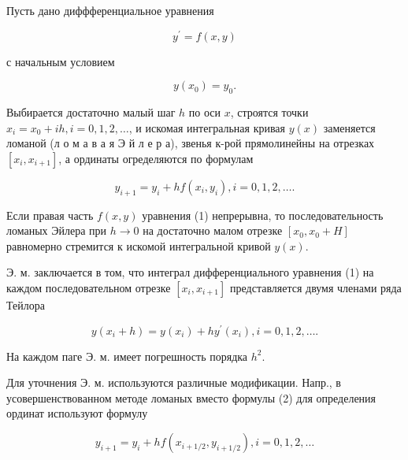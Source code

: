 \documentclass[10pt]{article}
\begin{document}
Пусть дано диффференциальное уравнения



\[

y^{\prime}=f(x, y)

\]



с начальным условием



\[

y\left(x_{0}\right)=y_{0} .

\]



Выбирается достаточно малый шаг $h$ по оси $x$, строятся точки $x_{i}=x_{0}+i h, i=0,1,2, \ldots$, и искомая интегральная кривая $y(x)$ заменяется ломаной (л о м а в а я Э й л е р а), звенья к-рой прямолинейны на отрезках $\left[x_{i}, x_{i+1}\right]$, а ординаты огределяются по формулам



\[

y_{i+1}=y_{i}+h f\left(x_{i}, y_{i}\right), i=0,1,2, \ldots .

\]



Если правая часть $f(x, y)$ уравнения (1) непрерывна, то последовательность ломаных Эйлера при $h \rightarrow 0$ на достаточно малом отрезке $\left[x_{0}, x_{0}+H\right]$ равномерно стремится к искомой интегральной кривой $y(x)$.



Э. м. заключается в том, что интеграл дифференциального уравнения (1) на каждом последовательном отрезке $\left[x_{i}, x_{i+1}\right]$ представляется двумя членами ряда Тейлора



\[

y\left(x_{i}+h\right)=y\left(x_{i}\right)+h y^{\prime}\left(x_{i}\right), i=0,1,2, \ldots .

\]



На каждом паге Э. м. имеет погрешность порядка $h^{2}$.



Для уточнения Э. м. используются различные модификации. Напр., в усовершенствованном методе ломаных вместо формулы (2) для определения ординат используют формулу



\[

y_{i+1}=y_{i}+h f\left(x_{i+1 / 2}, y_{i+1 / 2}\right), i=0,1,2, \ldots

\]
\end{document}
